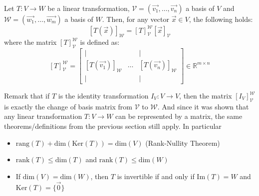 \begin{theorem}
    Let $T: V \to W$ be a linear transformation, $\mathcal{V} = (\vec{v_1}, \ldots, \vec{v_n})$ a basis of $V$ and $\mathcal{W} = (\vec{w_1}, \ldots, \vec{w_m})$ a basis of $W$. Then, for any vector $\vec{x} \in V$, the following holds:
    \[
        [T(\vec{x})]_{\mathcal{W}} = [T]^{\mathcal{W}}_{\mathcal{V}} [\vec{x}]_{\mathcal{V}}
    \]
    where the matrix $[T]^{\mathcal{W}}_{\mathcal{V}}$ is defined as:
    \[
        [T]^{\mathcal{W}}_{\mathcal{V}} = \begin{bmatrix}
            | & & | \\
            [T(\vec{v_1})]_{\mathcal{W}} & \ldots & [T(\vec{v_n})]_{\mathcal{W}} \\
            | & & |
        \end{bmatrix} \in \mathbb{R}^{m \times n}
    \]
\end{theorem}
Remark that if $T$ is the identity transformation $I_V: V \to V$, then the matrix $[I_V]^{\mathcal{W}}_{\mathcal{V}}$ is exactly the change of basis matrix from $\mathcal{V}$ to $\mathcal{W}$. And since it was shown that any linear transformation $T: V \to W$ can be represented by a matrix, the same theorems/definitions from the previous section still apply. In particular
\begin{itemize}[itemsep=1pt,label=$\circ$]
    \item $\text{rang}(T) + \text{dim}(\text{Ker}(T)) = \text{dim}(V)$ (Rank-Nullity Theorem)
    \item $\text{rank}(T) \leq \text{dim}(T)$ and $\text{rank}(T) \leq \text{dim}(W)$
    \item If $\text{dim}(V) = \text{dim}(W)$, then $T$ is invertible if and only if $\text{Im}(T) = W$ and $\text{Ker}(T) = \{\vec{0}\}$
\end{itemize}